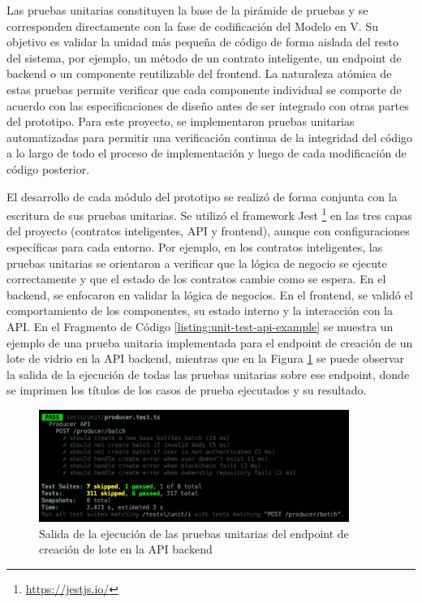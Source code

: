 Las pruebas unitarias constituyen la base de la pirámide de pruebas y se corresponden directamente con la fase de codificación del Modelo en V. Su objetivo es validar la unidad más pequeña de código de forma aislada del resto del sistema, por ejemplo, un método de un contrato inteligente, un endpoint de backend o un componente reutilizable del frontend. La naturaleza atómica de estas pruebas permite verificar que cada componente individual se comporte de acuerdo con las especificaciones de diseño antes de ser integrado con otras partes del prototipo. Para este proyecto, se implementaron pruebas unitarias automatizadas para permitir una verificación continua de la integridad del código a lo largo de todo el proceso de implementación y luego de cada modificación de código posterior.

El desarrollo de cada módulo del prototipo se realizó de forma conjunta con la escritura de sus pruebas unitarias. Se utilizó el framework Jest \footnote{\url{https://jestjs.io/}} en las tres capas del proyecto (contratos inteligentes, API y frontend), aunque con configuraciones específicas para cada entorno. Por ejemplo, en los contratos inteligentes, las pruebas unitarias se orientaron a verificar que la lógica de negocio se ejecute correctamente y que el estado de los contratos cambie como se espera. En el backend, se enfocaron en validar la lógica de negocios. En el frontend, se validó el comportamiento de los componentes, su estado interno y la interacción con la API. En el Fragmento de Código \ref{listing:unit-test-api-example} se muestra un ejemplo de una prueba unitaria implementada para el endpoint de creación de un lote de vidrio en la API backend, mientras que en la Figura \ref{fig:unit-test-api-results} se puede observar la salida de la ejecución de todas las pruebas unitarias sobre ese endpoint, donde se imprimen los títulos de los casos de prueba ejecutados y su resultado.

\begin{figure}[!htb]
	\centering
	\includegraphics[width=0.9\textwidth]{Figures/unit-test-api-results.png}
	\caption{Salida de la ejecución de las pruebas unitarias del endpoint de creación de lote en la API backend}
	\label{fig:unit-test-api-results}
\end{figure}

